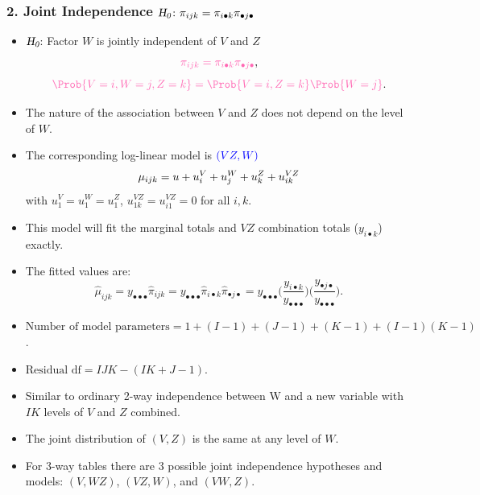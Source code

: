 \documentclass[oneside]{book}\usepackage[]{graphicx}\usepackage[svgnames]{xcolor}
\let\log\relax%
\newcommand{\HN}{\textsl{H}_{\textsl{0}}}%
\begin{document}
\subsubsection*{2. Joint Independence $ \HN\colon \pi_{ijk}=\pi_{i\bullet k}\pi_{\bullet j\bullet} $}
\begin{itemize}
    \item $ \HN $: Factor $ W $ is jointly independent of $ V $ and $ Z $
          \[ \textcolor{HotPink}{\pi_{ijk}=\pi_{i\bullet k}\pi_{\bullet j\bullet}}, \]
          \[ \textcolor{HotPink}{\Prob{V=i,W=j,Z=k}=\Prob{V=i,Z=k}\Prob{W=j}}. \]
    \item The nature of the association between $ V $ and $ Z $ does not depend on the level of $ W $.
    \item The corresponding log-linear model is $ \textcolor{Blue}{(VZ,W)} $
          \[ \log{\mu_{ijk}}=u+u_i^V+u_j^W+u_k^Z+u_{ik}^{VZ} \]
          with $ u_1^V=u_1^W=u_1^Z $, $ u_{1k}^{VZ}=u_{i1}^{VZ}=0 $ for all $ i,k $.
    \item This model will fit the marginal totals and $ VZ $ combination totals ($ y_{i\bullet k} $) exactly.
    \item The fitted values are:
          \[ \hat{\mu}_{ijk}=y_{\bullet\bullet\bullet}\hat{\pi}_{ijk}=y_{\bullet\bullet\bullet}\hat{\pi}_{i\bullet k}\hat{\pi}_{\bullet j\bullet}=y_{\bullet\bullet\bullet}\biggl(\frac{y_{i\bullet k}}{y_{\bullet\bullet\bullet}}\biggr)\biggl(\frac{y_{\bullet j\bullet}}{y_{\bullet\bullet\bullet}}\biggr). \]
    \item $ \text{Number of model parameters}=1 + (I - 1) + (J - 1) + (K - 1) + (I - 1)(K - 1) $.
    \item $ \text{Residual df}=IJK-(IK+J-1) $.
    \item Similar to ordinary 2-way independence between W and a new variable with $IK$
          levels of $V$ and $Z$ combined.
    \item The joint distribution of $(V,Z)$ is the same at any level of $W$.
    \item For 3-way tables there are 3 possible joint independence hypotheses and models:
          $(V,WZ)$, $(VZ,W)$, and $(VW,Z)$.
\end{itemize}
\end{document}
